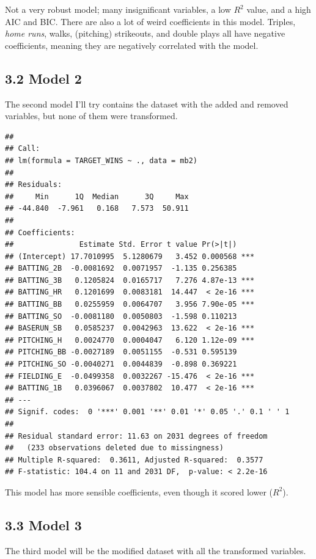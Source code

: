 \documentclass[]{article}
\begin{document}
Not a very robust model; many insignificant variables, a low \(R^2\)
value, and a high AIC and BIC. There are also a lot of weird
coefficients in this model. Triples, \emph{home runs}, walks, (pitching)
strikeouts, and double plays all have negative coefficients, meaning
they are negatively correlated with the model.

\subsection{3.2 Model 2}\label{model-2}

The second model I'll try contains the dataset with the added and
removed variables, but none of them were transformed.

\begin{verbatim}
## 
## Call:
## lm(formula = TARGET_WINS ~ ., data = mb2)
## 
## Residuals:
##     Min      1Q  Median      3Q     Max 
## -44.840  -7.961   0.168   7.573  50.911 
## 
## Coefficients:
##               Estimate Std. Error t value Pr(>|t|)    
## (Intercept) 17.7010995  5.1280679   3.452 0.000568 ***
## BATTING_2B  -0.0081692  0.0071957  -1.135 0.256385    
## BATTING_3B   0.1205824  0.0165717   7.276 4.87e-13 ***
## BATTING_HR   0.1201699  0.0083181  14.447  < 2e-16 ***
## BATTING_BB   0.0255959  0.0064707   3.956 7.90e-05 ***
## BATTING_SO  -0.0081180  0.0050803  -1.598 0.110213    
## BASERUN_SB   0.0585237  0.0042963  13.622  < 2e-16 ***
## PITCHING_H   0.0024770  0.0004047   6.120 1.12e-09 ***
## PITCHING_BB -0.0027189  0.0051155  -0.531 0.595139    
## PITCHING_SO -0.0040271  0.0044839  -0.898 0.369221    
## FIELDING_E  -0.0499358  0.0032267 -15.476  < 2e-16 ***
## BATTING_1B   0.0396067  0.0037802  10.477  < 2e-16 ***
## ---
## Signif. codes:  0 '***' 0.001 '**' 0.01 '*' 0.05 '.' 0.1 ' ' 1
## 
## Residual standard error: 11.63 on 2031 degrees of freedom
##   (233 observations deleted due to missingness)
## Multiple R-squared:  0.3611, Adjusted R-squared:  0.3577 
## F-statistic: 104.4 on 11 and 2031 DF,  p-value: < 2.2e-16
\end{verbatim}

This model has more sensible coefficients, even though it scored lower
(\(R^2\)).

\subsection{3.3 Model 3}\label{model-3}

The third model will be the modified dataset with all the transformed
variables.
\end{document}
